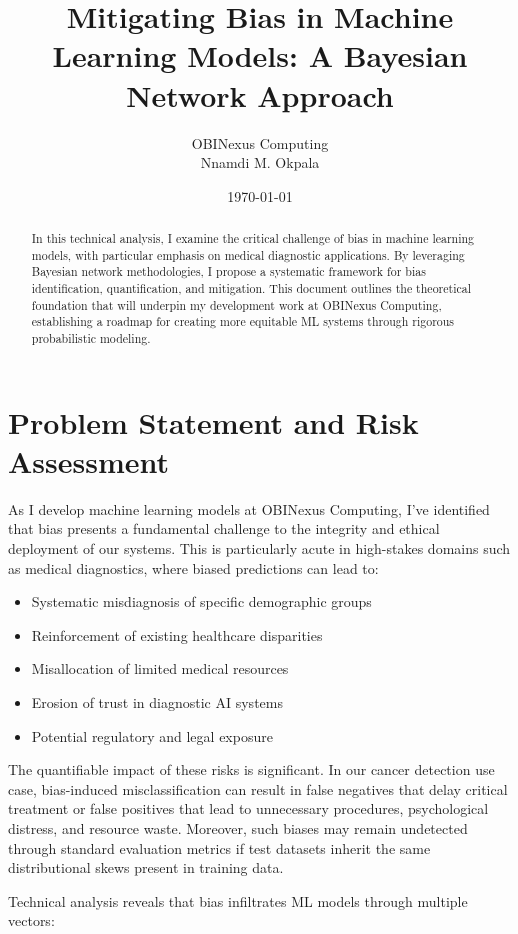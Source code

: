 \documentclass[12pt]{article}
\title{Mitigating Bias in Machine Learning Models: A Bayesian Network Approach}
\author{OBINexus Computing\\Nnamdi M. Okpala}
\date{\today}
\begin{document}
\maketitle

\begin{abstract}
In this technical analysis, I examine the critical challenge of bias in machine learning models, with particular emphasis on medical diagnostic applications. By leveraging Bayesian network methodologies, I propose a systematic framework for bias identification, quantification, and mitigation. This document outlines the theoretical foundation that will underpin my development work at OBINexus Computing, establishing a roadmap for creating more equitable ML systems through rigorous probabilistic modeling.
\end{abstract}

\section{Problem Statement and Risk Assessment}

As I develop machine learning models at OBINexus Computing, I've identified that bias presents a fundamental challenge to the integrity and ethical deployment of our systems. This is particularly acute in high-stakes domains such as medical diagnostics, where biased predictions can lead to:

\begin{itemize}
    \item Systematic misdiagnosis of specific demographic groups
    \item Reinforcement of existing healthcare disparities
    \item Misallocation of limited medical resources
    \item Erosion of trust in diagnostic AI systems
    \item Potential regulatory and legal exposure
\end{itemize}

The quantifiable impact of these risks is significant. In our cancer detection use case, bias-induced misclassification can result in false negatives that delay critical treatment or false positives that lead to unnecessary procedures, psychological distress, and resource waste. Moreover, such biases may remain undetected through standard evaluation metrics if test datasets inherit the same distributional skews present in training data.

Technical analysis reveals that bias infiltrates ML models through multiple vectors:
\end{document}
